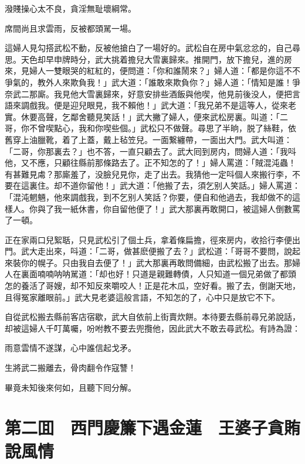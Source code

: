 \begin{myquote}
潑賤操心太不良，貪淫無耻壞綱常。

席間尚且求雲雨，反被都頭駡一場。
\end{myquote}

這婦人見勾搭武松不動，反被他搶白了一場好的。武松自在房中氣忿忿的，自己尋思。天色却早申牌時分，武大挑着擔兒大雪裏歸來。推開門，放下擔兒，進的房來，見婦人一雙眼哭的紅紅的，便問道：「你和誰鬧來？」婦人道：「都是你這不不爭氣的，教外人來欺負我！」武大道：「誰敢來欺負你？」婦人道：「情知是誰！爭奈武二那廝。我見他大雪裏歸來，好意安排些酒飯與他喫，他見前後没人，便把言語來調戲我。便是迎兒眼見，我不賴他！」武大道：「我兄弟不是這等人，從來老實。休要高聲，乞鄰舍聽見笑話！」武大撇了婦人，便來武松房裏。叫道：「二哥，你不曾喫點心，我和你喫些個。」武松只不做聲。尋思了半晌，脱了絲鞋，依舊穿上油臘靴，着了上蓋，戴上毡笠兒。一面繋纏帶，一面出大門。武大叫道：「二哥，你那裏去？」也不答，一直只顧去了。武大囘到房内，問婦人道：「我呌他，又不應，只顧往縣前那條路去了。正不知怎的了！」婦人罵道：「賊混沌蟲！有甚難見䖏？那廝羞了，没臉兒見你，走了出去。我猜他一定呌個人來搬行李，不要在這裏住。却不道你留他！」武大道：「他搬了去，須乞别人笑話。」婦人罵道：「混沌魍魎，他來調戲我，到不乞别人笑話？你要，便自和他過去，我却做不的這樣人。你與了我一紙休書，你自留他便了！」武大那裏再敢開口，被這婦人倒數罵了一頓。

正在家兩口兒絮聒，只見武松引了個土兵，拿着條扁擔，徑來房内，收拾行李便出門。武大走出來，呌道：「二哥，做甚麽便搬了去？」武松道：「哥哥不要問，說起來裝你的幌子。只由我自去便了！」武大那裏再敢問備細，由武松搬了出去。那婦人在裏面喃喃呐呐駡道：「却也好！只道是親難轉債，人只知道一個兄弟做了都頭怎的養活了哥嫂，却不知反來嚼咬人！正是花木瓜，空好看。搬了去，倒謝天地，且得冤家離眼前。」武大見老婆這般言語，不知怎的了，心中只是放它不下。

自從武松搬去縣前客店宿歇，武大自依前上街賣炊餅。本待要去縣前尋兄弟說話，却被這婦人千叮萬囑，吩咐教不要去兜攬他，因此武大不敢去尋武松。有詩為證：

\begin{myquote}
雨意雲情不遂謀，心中誰信起戈矛。

生將武二搬離去，骨肉翻令作寇讐！
\end{myquote}

畢竟未知後來何如，且聽下囘分解。



\chapter*{第二囬　西門慶簾下遇金蓮　王婆子貪賄說風情}

